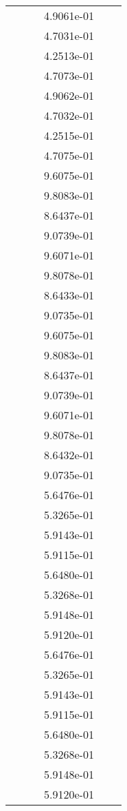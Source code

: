 \begin{xltabular}{\textwidth}{r|rS[table-format=1.3e+2]S[table-format=1.4e+2]S[table-format=1.4e+2]S[table-format=-1.5]}
&  &  & 4.9061e-01 & & \\
&  &  & 4.7031e-01 & & \\
&  &  & 4.2513e-01 & & \\
&  &  & 4.7073e-01 & & \\
&  &  & 4.9062e-01 & & \\
&  &  & 4.7032e-01 & & \\
&  &  & 4.2515e-01 & & \\
&  &  & 4.7075e-01 & & \\
&  &  & 9.6075e-01 & & \\
&  &  & 9.8083e-01 & & \\
&  &  & 8.6437e-01 & & \\
&  &  & 9.0739e-01 & & \\
&  &  & 9.6071e-01 & & \\
&  &  & 9.8078e-01 & & \\
&  &  & 8.6433e-01 & & \\
&  &  & 9.0735e-01 & & \\
&  &  & 9.6075e-01 & & \\
&  &  & 9.8083e-01 & & \\
&  &  & 8.6437e-01 & & \\
&  &  & 9.0739e-01 & & \\
&  &  & 9.6071e-01 & & \\
&  &  & 9.8078e-01 & & \\
&  &  & 8.6432e-01 & & \\
&  &  & 9.0735e-01 & & \\
&  &  & 5.6476e-01 & & \\
&  &  & 5.3265e-01 & & \\
&  &  & 5.9143e-01 & & \\
&  &  & 5.9115e-01 & & \\
&  &  & 5.6480e-01 & & \\
&  &  & 5.3268e-01 & & \\
&  &  & 5.9148e-01 & & \\
&  &  & 5.9120e-01 & & \\
&  &  & 5.6476e-01 & & \\
&  &  & 5.3265e-01 & & \\
&  &  & 5.9143e-01 & & \\
&  &  & 5.9115e-01 & & \\
&  &  & 5.6480e-01 & & \\
&  &  & 5.3268e-01 & & \\
&  &  & 5.9148e-01 & & \\
&  &  & 5.9120e-01 & & \\

\end{xltabular}
